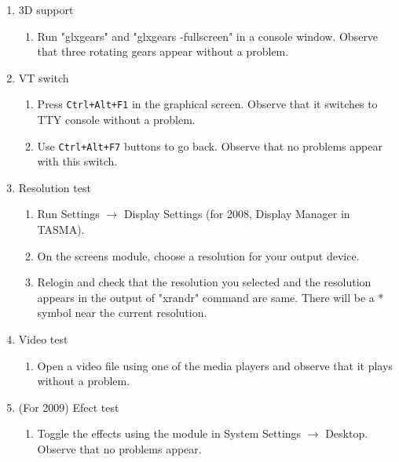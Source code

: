\documentclass[a4paper,10pt]{article}
\begin{document}
\begin{itemize}
\begin{enumerate}
  \item 3D support
    \begin{enumerate}
    \item Run "glxgears" and "glxgears -fullscreen" in a console window. Observe that three rotating gears appear without a problem.
    \end{enumerate}

  \item VT switch
    \begin{enumerate}
    \item Press \texttt{Ctrl+Alt+F1} in the graphical screen. Observe that it switches to TTY console without a problem.
    \item Use \texttt{Ctrl+Alt+F7} buttons to go back. Observe that no problems appear with this switch.
    \end{enumerate}

  \item Resolution test
    \begin{enumerate}
    \item Run Settings $\rightarrow$ Display Settings (for 2008, Display Manager in TASMA).
    \item On the screens module, choose a resolution for your output device.
    \item Relogin and check that the resolution you selected and the resolution appears in the output of "xrandr" command are same.
          There will be a * symbol near the current resolution.
    \end{enumerate}
 
  \item Video test
    \begin{enumerate}
    \item Open a video file using one of the media players and observe that it plays without a problem.
    \end{enumerate}
 
  \item (For 2009) Efect test
    \begin{enumerate}
    \item Toggle the effects using the module in System Settings $\rightarrow$ Desktop. Observe that no problems appear.
    \end{enumerate}
  \end{enumerate}
\end{itemize}
\end{document}
